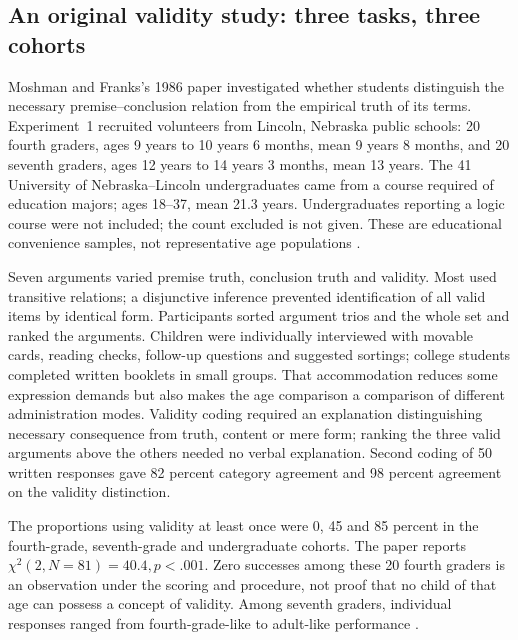 

\subsection{An original validity study: three tasks, three cohorts}
\label{sec:p19-r151-validity-record}

Moshman and Franks's 1986 paper investigated whether students distinguish the
necessary premise--conclusion relation from the empirical truth of its terms.
Experiment~1 recruited volunteers from Lincoln, Nebraska public schools:
20 fourth graders, ages 9 years to 10 years 6 months, mean 9 years 8 months,
and 20 seventh graders, ages 12 years to 14 years 3 months, mean 13 years.
The 41 University of Nebraska--Lincoln undergraduates came from a course
required of education majors; ages 18--37, mean 21.3 years. Undergraduates
reporting a logic course were not included; the count excluded is not given.
These are educational convenience samples, not representative age populations
\cite[pp.~153--156]{MoshmanFranks1986Validity}.

Seven arguments varied premise truth, conclusion truth and validity. Most used
transitive relations; a disjunctive inference prevented identification of all
valid items by identical form. Participants sorted argument trios and the whole
set and ranked the arguments. Children were individually interviewed with
movable cards, reading checks, follow-up questions and suggested sortings;
college students completed written booklets in small groups. That accommodation
reduces some expression demands but also makes the age comparison a comparison
of different administration modes. Validity coding required an explanation
distinguishing necessary consequence from truth, content or mere form; ranking
the three valid arguments above the others needed no verbal explanation.
Second coding of 50 written responses gave 82 percent category agreement and
98 percent agreement on the validity distinction.

The proportions using validity at least once were 0, 45 and 85 percent in the
fourth-grade, seventh-grade and undergraduate cohorts. The paper reports
\(\chi^2(2,N=81)=40.4,p<.001\). Zero successes among these 20 fourth
graders is an observation under the scoring and procedure, not proof that no
child of that age can possess a concept of validity. Among seventh graders,
individual responses ranged from fourth-grade-like to adult-like performance
\cite[pp.~156--158]{MoshmanFranks1986Validity}.

